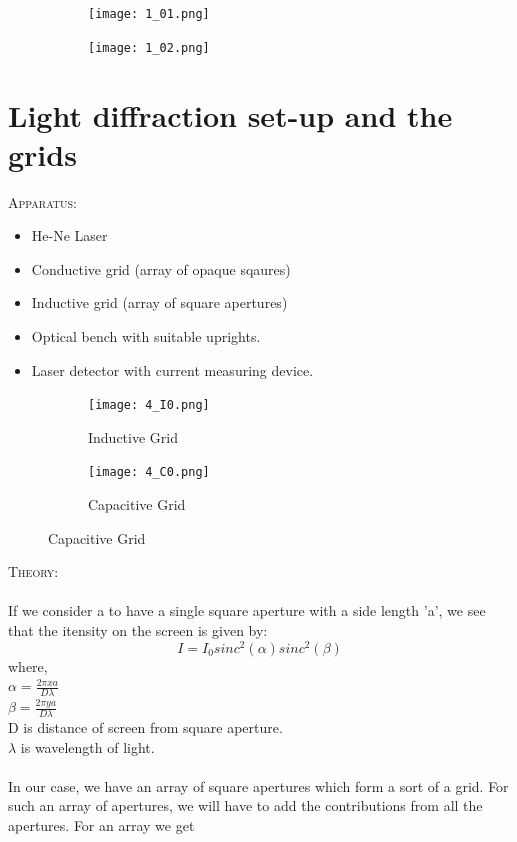 \documentclass[12pt]{report}
\begin{document}
\begin{figure}[h!]
	\centering
	\begin{subfigure}{0.65\textwidth}
		\texttt{[image: 1\_01.png]}
	\end{subfigure}
	\begin{subfigure}{0.65\textwidth}
		\texttt{[image: 1\_02.png]}
	\end{subfigure}
\end{figure}

\newpage
\section{Light diffraction set-up and the grids}
\textsc{\large{Apparatus:}}
\begin{itemize}
	\item He-Ne Laser
	\item Conductive grid (array of opaque sqaures)
	\item Inductive grid (array of square apertures)
	\item Optical bench with suitable uprights.
	\item Laser detector with current measuring device.
\end{itemize}
\begin{figure}[h!]
	\centering
	\begin{subfigure}{0.45\textwidth}
		\texttt{[image: 4\_I0.png]}
		\caption{Inductive Grid}
	\end{subfigure}
	\begin{subfigure}{0.45\textwidth}
		\texttt{[image: 4\_C0.png]}
		\caption{Capacitive Grid}
	\end{subfigure}
\end{figure}
\textsc{\large{Theory: }}
\\
\\
If we consider a to have a single square aperture with a side length 'a', we see that the itensity on the screen is given by:
$$ I = I_0 sinc^2(\alpha) sinc^2(\beta) $$
where,\\
$\alpha = \frac{2\pi xa}{D\lambda}$ \\
$\beta = \frac{2\pi ya}{D\lambda}$ \\
D is distance of screen from square aperture.\\
$\lambda$ is wavelength of light.
\\
\\
In our case, we have an array of square apertures which form a sort of a grid. For such an array of apertures, we will have to add the contributions from all the apertures. For an array we get
\end{document}
